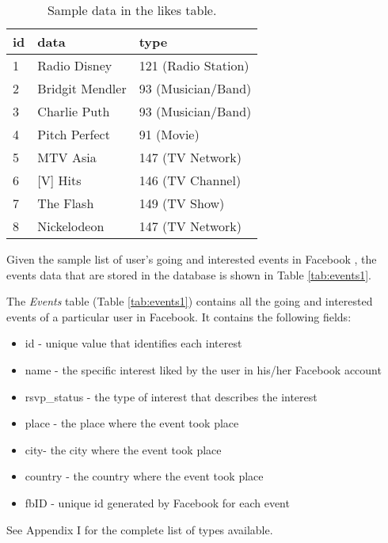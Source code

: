 \begin{table}[ph!]   %
	\centering
	\caption{Sample data in the likes table.} \vspace{0.25em}
	\begin{tabular}{|p{1.5cm}|p{2in}|p{1.5in}|} \hline
		\textbf{id} & \textbf{data} & \textbf{type} \\ \hline
		1 & Radio Disney & 121 (Radio Station) \\ \hline
		2 & Bridgit Mendler & 93 (Musician/Band) \\ \hline
		3 & Charlie Puth & 93 (Musician/Band) \\ \hline
		4 & Pitch Perfect & 91 (Movie) \\ \hline
		5 & MTV Asia & 147 (TV Network) \\ \hline
		6 & [V] Hits & 146 (TV Channel) \\ \hline
		7 & The Flash & 149 (TV Show) \\ \hline
		8 & Nickelodeon & 147 (TV Network) \\ \hline
	\end{tabular}
	\label{tab:Likes}
\end{table}

Given the sample list of user's going and interested events in Facebook , the events data that are stored in the database is shown in Table \ref{tab:events1}.

The \textit{Events} table (Table \ref{tab:events1}) contains all the going and interested events of a particular user in Facebook. It contains the following fields:
\begin{itemize}
	\item id - unique value that identifies each interest
	\item name - the specific interest liked by the user in his/her Facebook account
	\item rsvp\_status - the type of interest that describes the interest 
	\item place - the place where the event took place
	\item city- the city where the event took place
	\item country - the country where the event took place
	\item fbID - unique id generated by Facebook for each event
\end{itemize}
See Appendix I for the complete list of types available.
\clearpage

